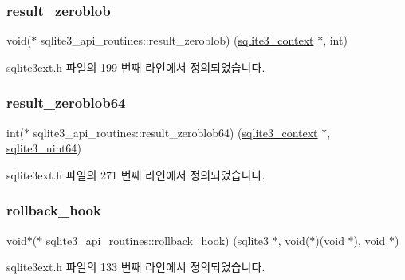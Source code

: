 \subsubsection{\texorpdfstring{result\+\_\+zeroblob}{result\_zeroblob}}
{\footnotesize\ttfamily void($\ast$ sqlite3\+\_\+api\+\_\+routines\+::result\+\_\+zeroblob) (\hyperlink{sqlite3_8h_a3b519553ffec8fc42b2356f5b1ebdc57}{sqlite3\+\_\+context} $\ast$, int)}



sqlite3ext.\+h 파일의 199 번째 라인에서 정의되었습니다.

\mbox{\label{structsqlite3__api__routines_aa2107e2591aa7a9e0e883b1972d32492}} 
\subsubsection{\texorpdfstring{result\+\_\+zeroblob64}{result\_zeroblob64}}
{\footnotesize\ttfamily int($\ast$ sqlite3\+\_\+api\+\_\+routines\+::result\+\_\+zeroblob64) (\hyperlink{sqlite3_8h_a3b519553ffec8fc42b2356f5b1ebdc57}{sqlite3\+\_\+context} $\ast$, \hyperlink{sqlite3_8h_a181c20ecfd72bc6627635746d382c610}{sqlite3\+\_\+uint64})}



sqlite3ext.\+h 파일의 271 번째 라인에서 정의되었습니다.

\mbox{\label{structsqlite3__api__routines_ac0784da0f9e7abd1cd8417a37e593aaf}} 
\subsubsection{\texorpdfstring{rollback\+\_\+hook}{rollback\_hook}}
{\footnotesize\ttfamily void$\ast$($\ast$ sqlite3\+\_\+api\+\_\+routines\+::rollback\+\_\+hook) (\hyperlink{sqlite3_8h_a0ef6f2646262c8a9b24368d8ac140f69}{sqlite3} $\ast$, void($\ast$)(void $\ast$), void $\ast$)}



sqlite3ext.\+h 파일의 133 번째 라인에서 정의되었습니다.

